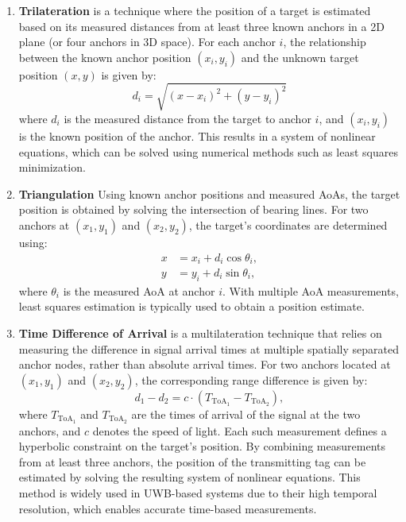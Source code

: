 \begin{enumerate}
    \item \textbf{Trilateration} is a technique where the position of a target is estimated based on its measured distances from at least three known anchors in a 2D plane (or four anchors in 3D space). For each anchor $i$, the relationship between the known anchor position $(x_i, y_i)$ and the unknown target position $(x, y)$ is given by:
    \begin{equation}
    d_i = \sqrt{(x - x_i)^2 + (y - y_i)^2}
    \end{equation}
    where $d_i$ is the measured distance from the target to anchor $i$, and $(x_i, y_i)$ is the known position of the anchor. This results in a system of nonlinear equations, which can be solved using numerical methods such as least squares minimization.

    \item \textbf{Triangulation}
    Using known anchor positions and measured AoAs, the target position is obtained by solving the intersection of bearing lines. For two anchors at $(x_1, y_1)$ and $(x_2, y_2)$, the target’s coordinates are determined using:
    \begin{align}
    x &= x_i + d_i \cos \theta_i, \\
    y &= y_i + d_i \sin \theta_i,
    \end{align}
    where $\theta_i$ is the measured AoA at anchor $i$. With multiple AoA measurements, least squares estimation is typically used to obtain a position estimate.

    \item \textbf{Time Difference of Arrival} is a multilateration technique that relies on measuring the difference in signal arrival times at multiple spatially separated anchor nodes, rather than absolute arrival times. For two anchors located at $(x_1, y_1)$ and $(x_2, y_2)$, the corresponding range difference is given by:
    \begin{equation} 
    d_1 - d_2 = c \cdot (T_{\text{ToA}_1} - T_{\text{ToA}_2}), 
    \end{equation}
    where $T_{\text{ToA}_1}$ and $T_{\text{ToA}_2}$ are the times of arrival of the signal at the two anchors, and $c$ denotes the speed of light. Each such measurement defines a hyperbolic constraint on the target's position. By combining measurements from at least three anchors, the position of the transmitting tag can be estimated by solving the resulting system of nonlinear equations. This method is widely used in UWB-based systems due to their high temporal resolution, which enables accurate time-based measurements.
\end{enumerate}

